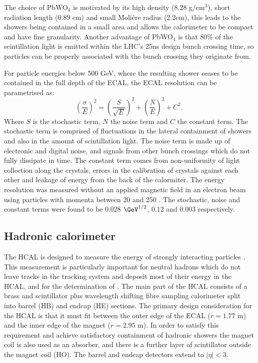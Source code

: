 The choice of PbWO$_{4}$ is motivated by its high density (8.28 g/cm$^{3}$), short radiation length (0.89 cm) and small Moli\'{e}re radius (2.2cm), this leads to the showers being contained in a small area and allows the calorimeter to be compact and have fine granularity. Another advantage of PbWO$_{4}$ is that 80\% of the scintillation light is emitted within the LHC's 25ns design bunch crossing time, so particles can be properly associated with the bunch crossing they originate from.

For particle energies below 500 GeV, where the resulting shower ceases to be contained in the full depth of the \ac{ECAL}, the \ac{ECAL} resolution can be parametrised as:
\begin{equation}
  \label{eq:ecalres}
  \left(\frac{\sigma}{E}\right)^2=\left(\frac{S}{\sqrt{E}}\right)^2+\left(\frac{N}{E}\right)^2+C^2.
\end{equation}
Where $S$ is the stochastic term, $N$ the noise term and $C$ the constant term. The stochastic term is comprised of fluctuations in the lateral containment of showers and also in the amount of scintillation light. The noise term is made up of electronic and digital noise, and signals from other bunch crossings which do not fully dissipate in time. The constant term comes from non-uniformity of light collection along the crystals, errors in the calibration of crystals against each other and leakage of energy from the back of the calormiter. The energy resolution was measured without an applied magnetic field in an electron beam using particles with momenta between 20 and 250 \GeV. The stochastic, noise and constant terms were found to be 0.028 $\GeV^{1/2}$, 0.12 \GeV and 0.003 respectively.

 

\subsection{Hadronic calorimeter}
\label{sec:HCAL}
The \ac{HCAL} is designed to measure the energy of strongly interacting particles \cite{Chatrchyan:2008aa}. This measurement is particularly important for neutral hadrons which do not leave tracks in the tracking system and deposit most of their energy in the \ac{HCAL}, and for the determination of \MET.  The main part of the \ac{HCAL} consists of a brass and scintillator plus wavelength shifting fibre sampling calorimeter split into barrel (\ac{HB}) and endcap (\ac{HE}) sections. The primary design consideration for the \ac{HCAL} is that it must fit between the outer edge of the \ac{ECAL} ($r=1.77$ m) and the inner edge of the magnet ($r=2.95$ m). In order to satisfy this requirement and achieve satisfactory containment of hadronic showers the magnet coil is also used as an absorber, and there is a further layer of scintillator outside the magnet coil (\ac{HO}). The barrel and endcap detectors extend to $|\eta|<3$.

